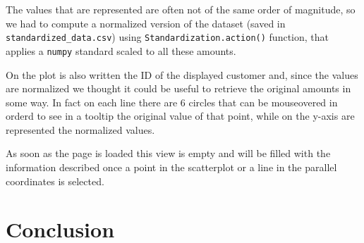 \documentclass[journal]{vgtc}                %
\begin{document}
The values that are represented are often not of the same order of magnitude, so we had to compute a normalized version of the dataset (saved in \texttt{standardized\_data.csv}) using \texttt{Standardization.action()} function, that applies
a \texttt{numpy} standard scaled to all these amounts.

On the plot is also written the ID of the displayed customer and, since the values are normalized we thought it could be useful to retrieve the original amounts in some way. In fact on each line there are 6 circles that can be mouseovered in orderd to see in a tooltip
the original value of that point, while on the y-axis are represented the normalized values.

As soon as the page is loaded this view is empty and will be filled with the information described once a point in the scatterplot or a line in the parallel coordinates is selected.


\section{Conclusion}


\acknowledgments{
}



\end{document}
